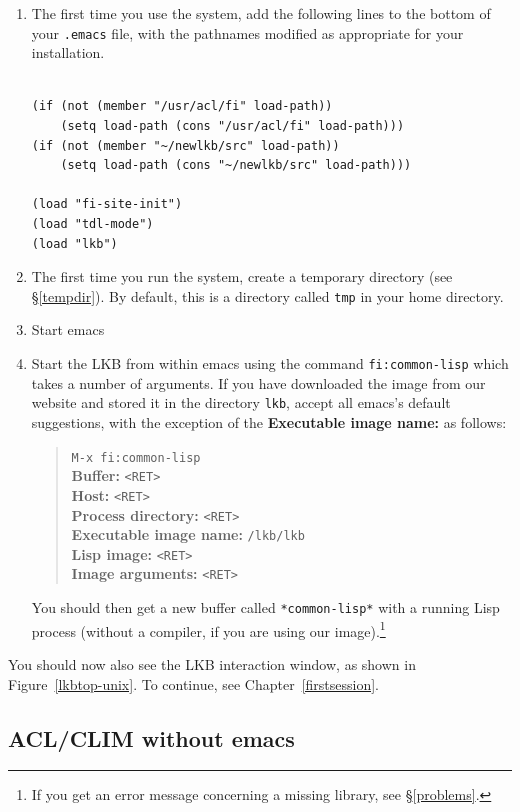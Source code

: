 \documentclass[12pt]{report}
\newcommand{\filename}[1]{{\tt #1}}
\begin{document}
\begin{enumerate}
\item The first time you use the system,
add the following lines to the bottom of your \filename{.emacs}
file, with the pathnames modified as appropriate for your
installation.
\begin{verbatim}

(if (not (member "/usr/acl/fi" load-path))
    (setq load-path (cons "/usr/acl/fi" load-path)))
(if (not (member "~/newlkb/src" load-path))
    (setq load-path (cons "~/newlkb/src" load-path)))
        
(load "fi-site-init")
(load "tdl-mode")
(load "lkb")
\end{verbatim}
\item The first time you run the system,
create a temporary directory (see \S\ref{tempdir}).  By default, this is
a directory called \filename{tmp} in your home directory.
\item Start emacs
\item Start the LKB from within emacs using the 
command \verb+fi:common-lisp+ which takes a number
of arguments.  If you have downloaded the image from our website
and stored it in the directory \filename{lkb}, accept all emacs's default
suggestions, with the exception of the {\bf Executable image name:}
as follows:
\begin{quote}
\verb+M-x fi:common-lisp+\\
{\bf Buffer:} \verb+<RET>+\\
{\bf Host:} \verb+<RET>+\\
{\bf Process directory:} \verb+<RET>+\\
{\bf Executable image name:} \verb+/lkb/lkb+\\
{\bf Lisp image:}  \verb+<RET>+\\
{\bf Image arguments:}  \verb+<RET>+
\end{quote}
You should then get a new buffer called \verb+*common-lisp*+ with
a running Lisp process (without a compiler, if you are using our
image).\footnote{If you get an error message concerning a missing library,
see \S\ref{problems}.}
\end{enumerate}
You
should now also see the LKB interaction window, as shown in 
Figure~\ref{lkbtop-unix}.
To continue, see Chapter~\ref{firstsession}.


\subsection{ACL/CLIM without emacs}
\label{clim-image}
\end{document}
